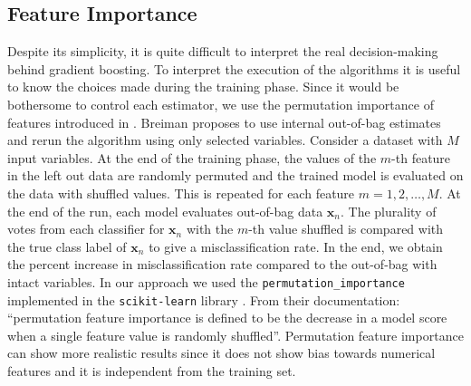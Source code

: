 \documentclass[../../Thesis.tex]{subfiles}
\begin{document}
 		\subsection{Feature Importance}
 			Despite its simplicity, it is quite difficult to interpret the real decision-making behind gradient boosting. To interpret the execution of the algorithms it is useful to know the choices made during the training phase. Since it would be bothersome to control each estimator, we use the permutation importance of features introduced in \cite{Breiman2001}. Breiman proposes to use internal out-of-bag estimates and rerun the algorithm using only selected variables.
 			Consider a dataset with $M$ input variables. At the end of the training phase, the values of the $m$-th feature in the left out data are randomly permuted and the trained model is evaluated on the data with shuffled values. This is repeated for each feature $m = 1, 2, \dots, M$. At the end of the run, each model evaluates out-of-bag data $\mathbf{x}_n$. The plurality of votes from each classifier for $\mathbf{x}_n$ with the $m$-th value shuffled is compared with the true class label of $\mathbf{x}_n$ to give a misclassification rate. In the end, we obtain the percent increase in misclassification rate compared to the out-of-bag with intact variables.
 			In our approach we used the \verb|permutation_importance| implemented in the \verb|scikit-learn| library \cite{sklearn_api}. From their documentation: “permutation feature importance is defined to be the decrease in a model score when a single feature value is randomly shuffled”. Permutation feature importance can show more realistic results since it does not show bias towards numerical features and it is independent from the training set.
 		
\end{document}
